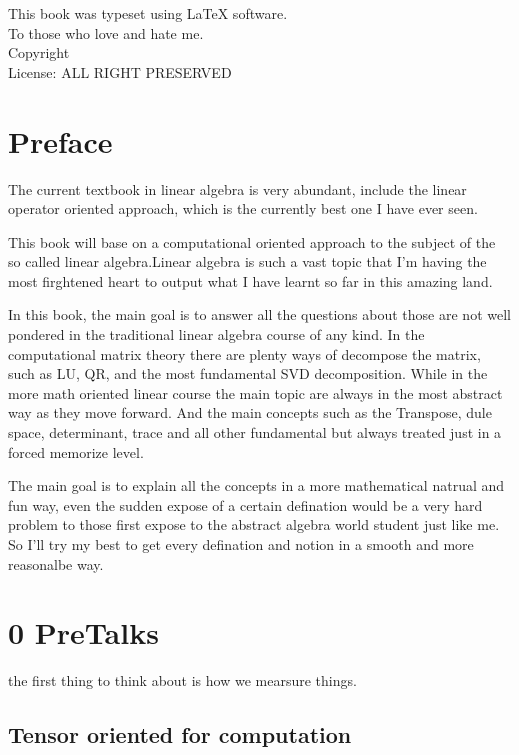 \documentclass{book}
\makeatletter
\newcommand{\booklicense}{ALL RIGHT PRESERVED}
\newcommand{\bookauthor}{\@author}
\newcommand{\prefacePara}
{
The current 
textbook in linear algebra is very abundant, 
include the linear operator oriented approach, 
which is the currently best one I have ever seen.

This book will base on a computational oriented 
approach to the subject of the so called linear
algebra.Linear algebra is such a vast topic that
I'm having the most firghtened heart to output
what I have learnt so far in this amazing land.

In this book, the main goal is to answer all the
questions about those are not well pondered in the
traditional linear algebra course of any kind.
In the computational matrix theory there are plenty
ways of decompose the matrix, such as LU, QR, and the
most fundamental SVD decomposition.
While in the more math oriented linear course
the main topic are always in the most abstract way
as they move forward.
And the main concepts such as the Transpose, dule
space, determinant, trace and all other fundamental
but always treated just in a forced memorize level.

The main goal is to explain all the concepts in a 
more mathematical natrual and fun way, even the sudden
expose of a certain defination would be a very hard
problem to those first expose to the abstract algebra
world student just like me. So I'll try my best to
get every defination and notion in a smooth and more
reasonalbe way. 
}
\makeatother
\begin{document}
\thispagestyle{empty}

\begin{flushleft}
    \vspace*{\fill}
    This book was typeset using \LaTeX{} software.\\
    To those who love and hate me.\\
    \vspace{\fill}
    Copyright \textcopyright{} \the\year{}  \bookauthor\\
    License: \booklicense
\end{flushleft}

\addtocounter{page}{2}

\chapter*{Preface}
\prefacePara{}

\setcounter{tocdepth}{3}
\tableofcontents

\mainmatter

\chapter{0 PreTalks}

the first thing to think about is how we mearsure things.

\section{Tensor oriented for computation}
\end{document}
